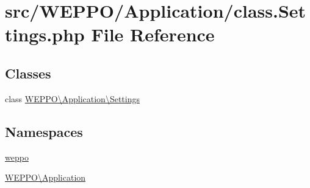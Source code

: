 \hypertarget{class_8Settings_8php}{}\section{src/\+W\+E\+P\+P\+O/\+Application/class.Settings.\+php File Reference}
\label{class_8Settings_8php}
\subsection*{Classes}
\begin{DoxyCompactItemize}
\item 
class \hyperlink{classWEPPO_1_1Application_1_1Settings}{W\+E\+P\+P\+O\textbackslash{}\+Application\textbackslash{}\+Settings}
\end{DoxyCompactItemize}
\subsection*{Namespaces}
\begin{DoxyCompactItemize}
\item 
 \hyperlink{namespaceweppo}{weppo}
\item 
 \hyperlink{namespaceWEPPO_1_1Application}{W\+E\+P\+P\+O\textbackslash{}\+Application}
\end{DoxyCompactItemize}
